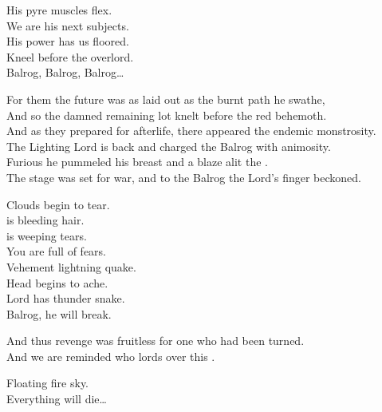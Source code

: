 His pyre muscles flex. \\
We are his next subjects. \\
His power has us floored. \\
Kneel before the overlord. \\

Balrog, Balrog, Balrog… \\


For them the future was as laid out as the burnt path he swathe, \\
And so the damned remaining lot knelt before the red behemoth. \\

And as they prepared for afterlife, there appeared the endemic monstrosity. \\
The Lighting Lord is back and charged the Balrog with animosity. \\

Furious he pummeled his breast and a blaze alit the . \\
The stage was set for war, and to the Balrog the Lord's finger beckoned. \\





Clouds begin to tear. \\
 is bleeding hair. \\
 is weeping tears. \\
You are full of fears. \\

Vehement lightning quake. \\
Head begins to ache. \\
Lord has thunder snake. \\
Balrog, he will break. \\


And thus revenge was fruitless for one who had been turned. \\
And we are reminded who lords over this . \\


Floating fire sky. \\
Everything will die… \\

